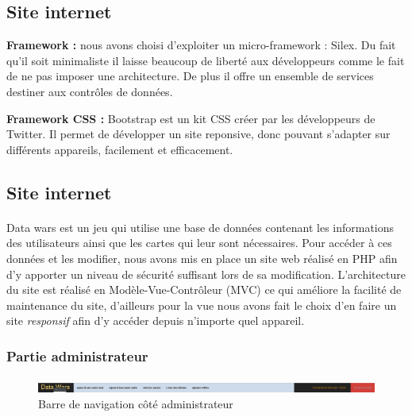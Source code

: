 \documentclass[a4paper,11pt]{report}
\title{}
\author{}
\begin{document}
	\subsection{Site internet}

	\textbf{Framework :} nous avons choisi d'exploiter un micro-framework : Silex. Du fait qu'il soit minimaliste il laisse beaucoup de liberté aux développeurs comme le fait de ne pas imposer une architecture. De plus il offre un ensemble de services destiner aux contrôles de données.

	\textbf{Framework CSS :} Bootstrap est un kit CSS créer par les développeurs de Twitter. Il permet de développer un site reponsive, donc pouvant s'adapter sur différents appareils, facilement et efficacement.

	\subsection{Site internet}

	\paragraph{}
        Data wars est un jeu qui utilise une base de données contenant les informations des utilisateurs ainsi que les cartes qui leur sont nécessaires. Pour accéder à ces données et les modifier, nous avons mis en place un site web réalisé en PHP afin d'y apporter un niveau de sécurité suffisant lors de sa modification. L'architecture du site est réalisé en Modèle-Vue-Contrôleur (MVC) ce qui améliore la facilité de maintenance du site, d’ailleurs pour la vue nous avons fait le choix d'en faire un site \textit{responsif} afin d'y accéder depuis n'importe quel appareil. 

	\subsubsection{Partie administrateur} 
	\paragraph{}

    	\begin{figure}[th]
      	 \begin{center}
          \includegraphics[scale=0.25]{Assets/navbar_admin.png}
          \caption{Barre de navigation côté administrateur}
          \label{RepTravail}
         \end{center}
        \end{figure}
\end{document}
